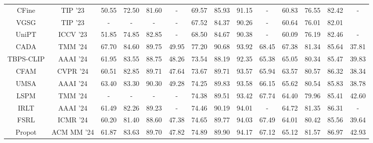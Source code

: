 \begin{table}[tp]
{\begin{tabular}{c|c|cccc|cccc|cccc}
CFine \cite{yan2023clip} & TIP '23 & 50.55 &72.50 &81.60 & - & 69.57 & 85.93 & 91.15 & - & 60.83 & 76.55 & 82.42 & -  \\ 
VGSG \cite{he2023vgsg} & TIP '23 & - & - & - & - & 67.52 & 84.37 & 90.26 & - &60.64 & 76.01 & 82.01  \\
UniPT \cite{shao2023unified} & ICCV '23 & 51.85 & 74.85 & 82.85 & - & 68.50 & 84.67 & 90.38 & - & 60.09 & 76.19 & 82.46 & -  \\
CADA \cite{lin2024cross} & TMM '24 & 67.70 & 84.60 & 89.75 & 49.95 & 77.20 & 90.68 & 93.92 & 68.45 & 67.38 & 81.34 & 85.64 & 37.81  \\ 
TBPS-CLIP \cite{cao2024empirical}  & AAAI '24 & 61.95 & 83.55 & 88.75 & 48.26 & 73.54 & 88.19 & 92.35 & 65.38 & 65.05 & 80.34 & 85.47 & 39.83  \\
CFAM \cite{zuo2024ufinebench} &  CVPR '24 & 60.51 & 82.85 & 89.71 & 47.64 & 73.67 & 89.71 & 93.57 & 65.94 & 63.57 & 80.57 & 86.32 & 38.34  \\
UMSA  \cite{zhao2024unifying} & AAAI '24 & 63.40 & 83.30 & 90.30 & 49.28 & 74.25 & 89.83 & 93.58 & 66.15 & 65.62 & 80.54 & 85.83 & 38.78  \\
LSPM \cite{li2024learning} & TMM '24 & - & - & - & -  & 74.38 & 89.51 & 93.42 & 67.74 & 64.40 & 79.96 & 85.41 & 42.60 \\
IRLT \cite{liu2024causality} & AAAI '24 & 61.49 & 82.26 & 89.23 & -  & 74.46 & 90.19 & 94.01 & - & 64.72 & 81.35 & 86.31 & - \\
FSRL \cite{wang2024fine} & ICMR '24 & 60.20 & 81.40 & 88.60 & 47.38 & 74.65 & 89.77 & 94.03 & 67.49 & 64.01 & 80.42 & 85.56 & 39.64  \\
Propot \cite{yan2024prototypical} & ACM MM '24 & 61.87 & 83.63 & 89.70 & 47.82 & 74.89 & 89.90 & 94.17 & 67.12 & 65.12 & 81.57 & 86.97 & 42.93  \\


\end{tabular}}
\end{table}
